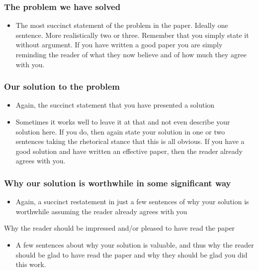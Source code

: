 \documentclass[11pt]{article}
\begin{document}
\subsubsection*{The problem we have solved}
\begin{itemize}
\item   The most succinct statement of the problem in the paper. Ideally one
sentence. More realistically two or three. Remember that you simply state it
without argument. If you have written a good paper you are simply reminding the
reader of what they now believe and of how much they agree with you.

\end{itemize}



\subsubsection*{Our solution to the problem}
\begin{itemize}
\item    
Again, the succinct statement that you have presented a solution

\item   Sometimes it works well to leave it at that and not even describe your
solution here. If you do, then again state your solution in one or two
sentences taking the rhetorical stance that this is all obvious. If you have a
good solution and have written an effective paper, then the reader already
agrees with you.

\end{itemize}



\subsubsection*{Why our solution is worthwhile in some significant way}
\begin{itemize}
\item   
Again, a succinct restatement in just a few sentences of why your solution is
worthwhile assuming the reader already agrees with you

\end{itemize}



Why the reader should be impressed and/or pleased to have read the paper
\begin{itemize}
\item   A few sentences about why your solution is valuable, and thus why the
reader should be glad to have read the paper and why they should be glad you
did this work.

\end{itemize}
\end{document}
